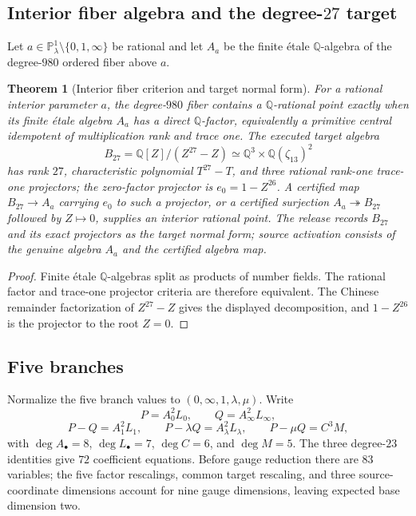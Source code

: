 \documentclass[11pt]{article}
\newtheorem{theorem}{Theorem}[section]
\theoremstyle{remark}
\newcommand{\Q}{\mathbb Q}
\newcommand{\Pone}{\mathbb P^1}
\begin{document}
\subsection{Interior fiber algebra and the \texorpdfstring{degree-$27$}{degree-27} target}
Let $a\in\Pone_\lambda\setminus\{0,1,\infty\}$ be rational and let $A_a$ be the finite \'etale $\Q$-algebra of the degree-$980$ ordered fiber above $a$.

\begin{theorem}[Interior fiber criterion and target normal form]\label{thm:b27-target}
For a rational interior parameter $a$, the degree-$980$ fiber contains a $\Q$-rational point exactly when its finite \'etale algebra $A_a$ has a direct $\Q$-factor, equivalently a primitive central idempotent of multiplication rank and trace one.  The executed target algebra
\[
 B_{27}=\Q[Z]/(Z^{27}-Z)\simeq\Q^3\times\Q(\zeta_{13})^2
\]
has rank $27$, characteristic polynomial $T^{27}-T$, and three rational rank-one trace-one projectors; the zero-factor projector is $e_0=1-Z^{26}$.  A certified map $B_{27}\to A_a$ carrying $e_0$ to such a projector, or a certified surjection $A_a\twoheadrightarrow B_{27}$ followed by $Z\mapsto0$, supplies an interior rational point.  The release records $B_{27}$ and its exact projectors as the target normal form; source activation consists of the genuine algebra $A_a$ and the certified algebra map.
\end{theorem}

\begin{proof}
Finite \'etale $\Q$-algebras split as products of number fields.  The rational factor and trace-one projector criteria are therefore equivalent.  The Chinese remainder factorization of $Z^{27}-Z$ gives the displayed decomposition, and $1-Z^{26}$ is the projector to the root $Z=0$.
\end{proof}

\subsection{Five branches}
Normalize the five branch values to $(0,\infty,1,\lambda,\mu)$.  Write
\[
 P=A_0^2L_0,
 \qquad Q=A_\infty^2L_\infty,
\]
\[
 P-Q=A_1^2L_1,
 \qquad P-\lambda Q=A_\lambda^2L_\lambda,
 \qquad P-\mu Q=C^3M,
\]
with $\deg A_\bullet=8$, $\deg L_\bullet=7$, $\deg C=6$, and $\deg M=5$.  The three degree-$23$ identities give $72$ coefficient equations.  Before gauge reduction there are $83$ variables; the five factor rescalings, common target rescaling, and three source-coordinate dimensions account for nine gauge dimensions, leaving expected base dimension two.
\end{document}
